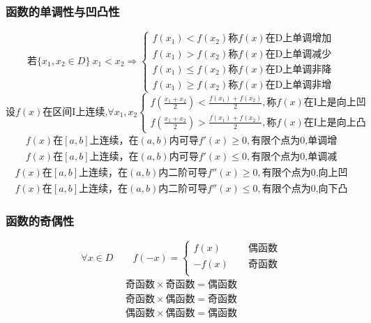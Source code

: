  \subsubsection{函数的单调性与凹凸性}
 $$\mbox{若}\{x_1,x_2\in D\}\ x_1<x_2\Rightarrow \begin{cases}
    f(x_1)<f(x_2)  \mbox{称}f(x)\mbox{在D上单调增加}\\
    f(x_1)>f(x_2)  \mbox{称}f(x)\mbox{在D上单调减少}\\
    f(x_1)\leqslant f(x_2)  \mbox{称}f(x)\mbox{在D上单调非降}\\
    f(x_1)\geqslant f(x_2)  \mbox{称}f(x)\mbox{在D上单调非增}
 \end{cases}$$
 $$\mbox{设$f(x)$在区间I上连续,$\forall x_1,x_2$}\begin{cases}
    f\left(\frac{x_1+x_2}{2}\right)<\frac{f(x_1)+f(x_2)}{2},\mbox{称$f(x)$在I上是向上凹}\\
    f\left(\frac{x_1+x_2}{2}\right)>\frac{f(x_1)+f(x_2)}{2},\mbox{称$f(x)$在I上是向上凸}
 \end{cases}$$
 \begin{align}
    f(x)\mbox{在}\left[a,b\right]\mbox{上连续，在}(a,b)\mbox{内可导}f'(x)\geqslant 0,\mbox{有限个点为0,单调增} \label{monotonous_1}\\
    f(x)\mbox{在}\left[a,b\right]\mbox{上连续，在}(a,b)\mbox{内可导}f'(x)\leqslant 0,\mbox{有限个点为0,单调减} \label{monotonous_2}
 \end{align}
 \begin{align}
    f(x)\mbox{在}\left[a,b\right]\mbox{上连续，在}(a,b)\mbox{内二阶可导}f''(x)\geqslant 0,\mbox{有限个点为0,向上凹} \label{monotonous_3}\\
    f(x)\mbox{在}\left[a,b\right]\mbox{上连续，在}(a,b)\mbox{内二阶可导}f''(x)\leqslant 0,\mbox{有限个点为0,向下凸} \label{monotonous_4}
 \end{align}
\subsubsection{函数的奇偶性}
 $$\forall x\in D\qquad f(-x)=\begin{cases}
    f(x)\qquad &\mbox{偶函数}\\
    -f(x) &\mbox{奇函数}\\
 \end{cases}$$
\begin{align}
    \mbox{奇函数}\times \mbox{奇函数}=\mbox{偶函数}\\
    \mbox{奇函数}\times \mbox{偶函数}=\mbox{奇函数}\\
    \mbox{偶函数}\times \mbox{偶函数}=\mbox{偶函数}
 \end{align}

